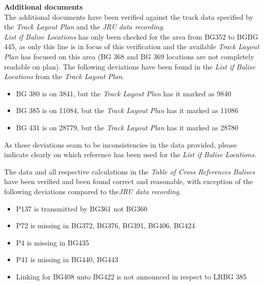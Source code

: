 \documentclass{article}
\begin{document}
\textbf{Additional documents}\\

The additional documents have been verified against the track data specified by the \textit{Track Layout Plan} and the \textit{JRU data recording}.\\

\textit{List if Balise Locations} has only been checked for the area from BG352 to BGBG 445, as only this line is in focus of this verification and the available \textit{Track Layout Plan} has focused on this area (BG 368 and BG 369 locations are not completely readable on plan). The following deviations have been found in the \textit{List if Balise Locations} from the \textit{Track Layout Plan}.
\begin{itemize}
\item BG 380 is on 3841, but the \textit{Track Layout Plan} has it marked as 9840
\item BG 385 is on 11084, but the \textit{Track Layout Plan} has it marked as 11086
\item BG 431 is on 28779, but the \textit{Track Layout Plan} has it marked as 28780
\end{itemize}
As these deviations seam to be inconsistencies in the data provided, please indicate clearly on which reference has been used for the \textit{List if Balise Locations}.

The data and all respective calculations in the \textit{Table of Cross References Balises} have been verified and been found correct and reasonable, with exception of the following deviations compared to the\textit{JRU data recording}.
\begin{itemize}
\item P137 is transmitted by BG361 not BG360
\item P72 is missing in BG372, BG376, BG391, BG406, BG424
\item P4 is missing in BG435
\item P41 is missing in BG440, BG443
\item Linking for BG408 unto BG422 is not announced in respect to LRBG 385
\end{itemize}
\end{document}
